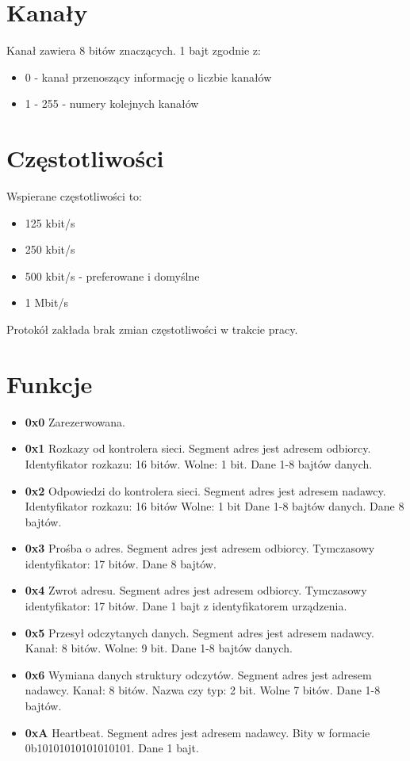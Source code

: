 \documentclass{article}
\begin{document}
\section*{Kanały}
Kanał zawiera 8 bitów znaczących. 1 bajt zgodnie z:
\begin{itemize}
    \item 0 - kanał przenoszący informację o liczbie kanałów
    \item 1 - 255 - numery kolejnych kanałów
\end{itemize}

\section*{Częstotliwości}
Wspierane częstotliwości to:
\begin{itemize}
    \item 125 kbit/s
    \item 250 kbit/s
    \item 500 kbit/s - preferowane i domyślne
    \item 1 Mbit/s
\end{itemize}
Protokół zakłada brak zmian częstotliwości w trakcie pracy.
\goodbreak
\section*{Funkcje}
\begin{itemize}
    \item \textbf{0x0} Zarezerwowana.
    \item \textbf{0x1} Rozkazy od kontrolera sieci. 
    Segment adres jest adresem odbiorcy. 
    Identyfikator rozkazu: 16 bitów. 
    Wolne: 1 bit. 
    Dane 1-8 bajtów danych.
    \item \textbf{0x2} Odpowiedzi do kontrolera sieci.
    Segment adres jest adresem nadawcy.
    Identyfikator rozkazu: 16 bitów
    Wolne: 1 bit
    Dane 1-8 bajtów danych. 
    Dane 8 bajtów.
    \item \textbf{0x3} Prośba o adres. 
    Segment adres jest adresem odbiorcy. 
    Tymczasowy identyfikator: 17 bitów. 
    Dane 8 bajtów.
    \item \textbf{0x4} Zwrot adresu. 
    Segment adres jest adresem odbiorcy. 
    Tymczasowy identyfikator: 17 bitów. 
    Dane 1 bajt z identyfikatorem urządzenia.
    \item \textbf{0x5} Przesył odczytanych danych. 
    Segment adres jest adresem nadawcy. 
    Kanał: 8 bitów. 
    Wolne: 9 bit. 
    Dane 1-8 bajtów danych.
    \item \textbf{0x6} Wymiana danych struktury odczytów. 
    Segment adres jest adresem nadawcy. 
    Kanał: 8 bitów. 
    Nazwa czy typ: 2 bit. 
    Wolne 7 bitów.
    Dane 1-8 bajtów.
     \item \textbf{0xA} Heartbeat. 
    Segment adres jest adresem nadawcy. 
    Bity w formacie 0b10101010101010101.
    Dane 1 bajt.
\end{itemize}
\end{document}
